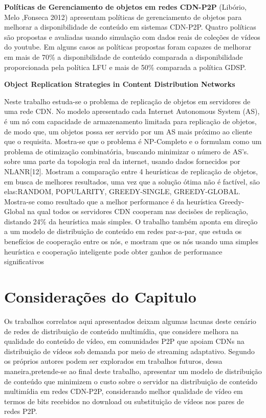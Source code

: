 \documentclass[
	12pt,				%
	oneside,			%
	a4paper,			%
	english,			%
	brazil				%
	]{abntex2ppgsi}
\begin{document}
\textbf{Políticas de Gerenciamento de objetos em redes CDN-P2P}
\newline
(Libório, Melo ,Fonseca 2012) apresentam políticas de gerenciamento de objetos para melhorar a disponibilidade de conteúdo em sistemas CDN-P2P. Quatro políticas são propostas e avaliadas usando simulação com dados reais de coleções de vídeos do youtube. Em alguns casos as políticas propostas foram capazes de melhorar em mais de 70\% a disponibilidade de conteúdo comparada a disponibilidade proporcionada pela política LFU e mais de 50\% comparada a política GDSP.

\textbf{Object Replication Strategies in Content Distribution Networks}

Neste trabalho estuda-se o problema de replicação de objetos em servidores de uma rede CDN. No modelo apresentado cada Internet Autonomous System (AS), é um nó com capacidade de armazenamento limitada para replicação de objetos, de modo que, um objetos possa ser servido por um AS mais próximo ao cliente que o requisita. Mostra-se que o problema é NP-Completo e o formulam como um problema de otimização combinatória, buscando minimizar o número de AS's. sobre uma parte da topologia real da internet, usando dados fornecidos por NLANR[12].
Mostram a comparação entre 4 heurísticas de replicação de objetos, em busca de melhores resultados, uma vez que a solução ótima não é factível, são elas:RANDOM, POPULARITY, GREEDY-SINGLE, GREEDY-GLOBAL.
Mostra-se como resultado que a melhor performance é da heurística Greedy-Global na qual todos os servidores CDN cooperam nas decisões de replicação, distando 24\% da heurística mais simples.
O trabalho também aponta em direção a um modelo de distribuição de conteúdo em redes par-a-par, que estuda os benefícios de cooperação entre os nós, e mostram que os nós usando uma simples heurística e cooperação inteligente pode obter ganhos de performance significativos


\section{Considerações do Capitulo}

Os trabalhos correlatos aqui apresentados deixam algumas lacunas deste cenário de redes de distribuição de conteúdo multimídia, que considere melhora na qualidade do conteúdo de vídeo, em comunidades P2P que apoiam CDNs na distribuição de vídeos sob demanda por meio de streaming adaptativo. Segundo os próprios autores podem ser explorados em trabalhos futuros, dessa maneira,pretende-se ao final deste trabalho, apresentar um modelo de distribuição de conteúdo que minimizem o custo sobre o servidor na distribuição de conteúdo multimídia em redes CDN-P2P, considerando melhor qualidade de vídeo em termos de bits recebidos no download ou substituição de vídeos nos pares de redes P2P.
\end{document}
